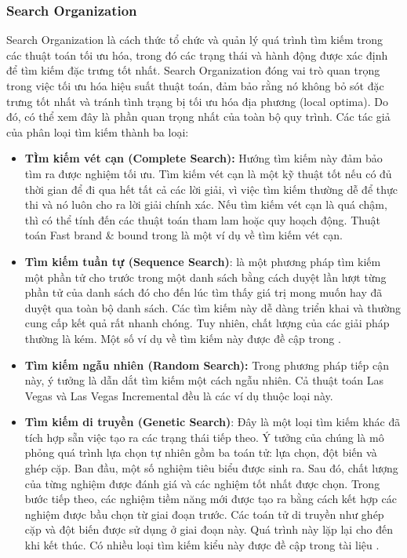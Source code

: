 \subsubsection{Search Organization}
Search Organization là cách thức tổ chức và quản lý quá trình tìm kiếm trong các thuật toán tối ưu hóa, trong đó các trạng thái và hành động được xác định để tìm kiếm đặc trưng tốt nhất. Search Organization đóng vai trò quan trọng trong việc tối ưu hóa hiệu suất thuật toán, đảm bảo rằng nó không bỏ sót đặc trưng tốt nhất và tránh tình trạng bị tối ưu hóa địa phương (local optima). Do đó, có thể xem đây là phần quan trọng nhất của toàn bộ quy trình. Các tác giả của \cite{liu2005toward} phân loại tìm kiếm thành ba loại:
\begin{itemize}
	\item \textbf{TÌm kiếm vét cạn (Complete Search):} Hướng tìm kiếm này đảm bảo tìm ra được nghiệm tối ưu. Tìm kiếm vét cạn là một kỹ thuật tốt nếu có đủ thời gian để đi qua hết tất cả các lời giải, vì việc tìm kiếm thường dễ để thực thi và nó luôn cho ra lời giải chính xác. Nếu tìm kiếm vét cạn là quá chậm, thì có thể tính đến các thuật toán tham lam hoặc quy hoạch động. Thuật toán Fast brand \& bound trong \cite{somol2004fast} là một ví dụ về tìm kiếm vét cạn.
	\item \textbf{Tìm kiếm tuần tự (Sequence Search)}: là một phương pháp tìm kiếm một phần tử cho trước trong một danh sách bằng cách duyệt lần lượt từng phần tử của danh sách đó cho đến lúc tìm thấy giá trị mong muốn hay đã duyệt qua toàn bộ danh sách. Các tìm kiếm này dễ dàng triển khai và thường cung cấp kết quả rất nhanh chóng. Tuy nhiên, chất lượng của các giải pháp thường là kém. Một số ví dụ về tìm kiếm này được đề cập trong \cite{hao2003comparison}.
	\item \textbf{Tìm kiếm ngẫu nhiên (Random Search):} Trong phương pháp tiếp cận này, ý tưởng là dẫn dắt tìm kiếm một cách ngẫu nhiên. Cả thuật toán Las Vegas và Las Vegas Incremental \cite{molina2002feature} đều là các ví dụ thuộc loại này.
	\item\textbf{ Tìm kiếm di truyền (Genetic Search)}: Đây là một loại tìm kiếm khác đã tích hợp sẵn việc tạo ra các trạng thái tiếp theo. Ý tưởng của chúng là mô phỏng quá trình lựa chọn tự nhiên gồm ba toán tử: lựa chọn, đột biến và ghép cặp. Ban đầu, một số nghiệm tiêu biểu được sinh ra. Sau đó, chất lượng của từng nghiệm được đánh giá và các nghiệm tốt nhất được chọn. Trong bước tiếp theo, các nghiệm tiềm năng mới được tạo ra bằng cách kết hợp các nghiệm được bầu chọn từ giai đoạn trước. Các toán tử di truyền như ghép cặp và đột biến được sử dụng ở giai đoạn này. Quá trình này lặp lại cho đến khi kết thúc. Có nhiều loại tìm kiếm kiểu này được đề cập trong tài liệu \cite{yusta2009different}.
\end{itemize}

